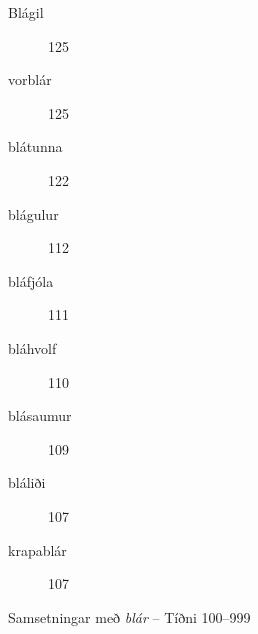\documentclass[../samsetningasafn.tex]{subfiles}
\begin{document}
\begin{bigwordlist}
\begin{footnotesize}
\begin{multicols}{4}
\begin{description}
		\item [Blágil]			125
		\item [vorblár]		125
		\item [blátunna]		122
		\item [blágulur]		112
		\item [bláfjóla]		111
		\item [bláhvolf]		110
		\item [blásaumur]	109
		\item [bláliði]			107
		\item [krapablár]	107
	\end{description}
\end{multicols}
\end{footnotesize}
	
\label{listi:blar999}
\caption{Samsetningar með \textit{blár} -- Tíðni 100--999}
\end{bigwordlist}		
\end{document}
